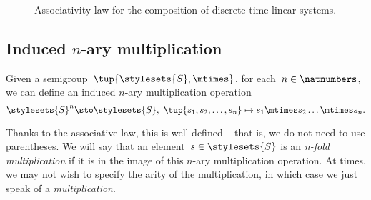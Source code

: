 \begin{figure}[tbh]
	\centering
	\prflinepadbefore=5pt
	\prflinepadafter=5pt
	{
	}
	\caption{Associativity law for the composition of discrete-time linear systems. }
	\label{fig:ass_dyn_syst}
\end{figure}

\subsection{Induced $n$-ary multiplication}
Given a semigroup~$\tup{\stylesets{S}, \mtimes}$, for each~$n \in \natnumbers$, we can define an induced $n$-ary multiplication operation
\begin{equation*}
	\stylesets{S}^n \sto \stylesets{S}, \ \tup{s_1, s_2, \dots, s_n} \mapsto s_1 \mtimes s_2 \dots \mtimes s_n.
\end{equation*}


Thanks to the associative law, this is well-defined -- that is, we do not need to use parentheses.
We will say that an element~$s \in \stylesets{S}$ is an \emph{n-fold multiplication} if it is in the image of this $n$-ary multiplication operation.
At times, we may not wish to specify the arity of the multiplication, in which case we just speak of a \emph{multiplication}.

\showslides{\begin{forslides}
		\begin{equation}
			\label{eq:sg-mora}
			\mora
		\end{equation}
		\begin{equation}
			\label{eq:sg-morb}
			\morb
		\end{equation}
		\begin{equation}
			\label{eq:sg-morab}
			\mora\then\morb
		\end{equation}
	\end{forslides}
}
